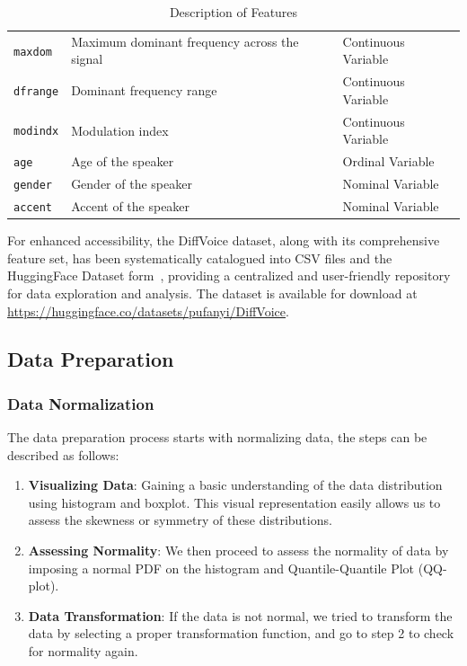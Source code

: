 \documentclass{article}
\begin{document}
{\begin{table}
\begin{tabular}{lll}
				\texttt{maxdom} & Maximum dominant frequency across the signal & Continuous Variable \\
				\texttt{dfrange} & Dominant frequency range & Continuous Variable \\
				\texttt{modindx} & Modulation index & Continuous Variable \\
				\texttt{age} & Age of the speaker & Ordinal Variable \\
				\texttt{gender} & Gender of the speaker & Nominal Variable \\
				\texttt{accent} & Accent of the speaker & Nominal Variable \\
				\hline
			\end{tabular}
			\caption{Description of Features}
			\label{table:features_description}
		\end{table}
	}
	
	For enhanced accessibility, the DiffVoice dataset, along with its comprehensive feature set, has been systematically catalogued into CSV files and the HuggingFace Dataset form~\cite{lhoest2021datasets}, providing a centralized and user-friendly repository for data exploration and analysis. The dataset is available for download at \url{https://huggingface.co/datasets/pufanyi/DiffVoice}.	
	
	\subsection{Data Preparation}
	
	\subsubsection{Data Normalization}
	
	The data preparation process starts with normalizing data, the steps can be described as follows:
	
	\begin{enumerate}
		\item \textbf{Visualizing Data}: Gaining a basic understanding of the data distribution using histogram and boxplot. This visual representation easily allows us to assess the skewness or symmetry of these distributions.
		\item \textbf{Assessing Normality}: We then proceed to assess the normality of data by imposing a normal PDF on the histogram and Quantile-Quantile Plot (QQ-plot).
		\item \textbf{Data Transformation}: If the data is not normal, we tried to transform the data by selecting a proper transformation function, and go to step 2 to check for normality again.
	\end{enumerate}
	
\end{document}
